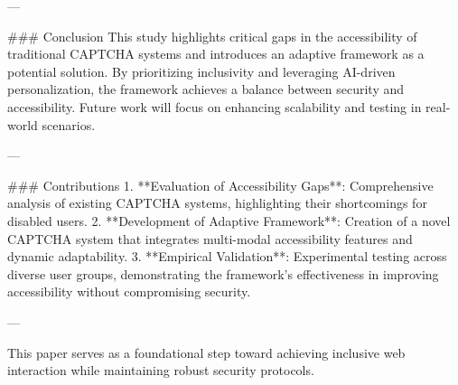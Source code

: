 ---

### Conclusion
This study highlights critical gaps in the accessibility of traditional CAPTCHA systems and introduces an adaptive framework as a potential solution. By prioritizing inclusivity and leveraging AI-driven personalization, the framework achieves a balance between security and accessibility. Future work will focus on enhancing scalability and testing in real-world scenarios.

---

### Contributions
1. **Evaluation of Accessibility Gaps**: Comprehensive analysis of existing CAPTCHA systems, highlighting their shortcomings for disabled users.
2. **Development of Adaptive Framework**: Creation of a novel CAPTCHA system that integrates multi-modal accessibility features and dynamic adaptability.
3. **Empirical Validation**: Experimental testing across diverse user groups, demonstrating the framework's effectiveness in improving accessibility without compromising security.

---

This paper serves as a foundational step toward achieving inclusive web interaction while maintaining robust security protocols.
